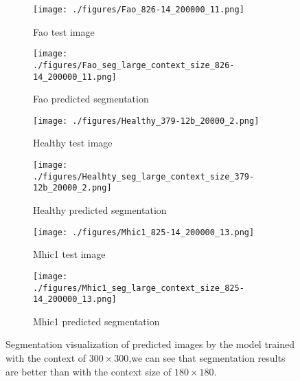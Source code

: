 \begin{figure}[th!]
    \begin{subfigure}{.5\textwidth}
         \centering
        \texttt{[image: ./figures/Fao\_826-14\_200000\_11.png]}
        \caption{Fao test image}
        \label{fig:fao_raw}
    \end{subfigure}
  \begin{subfigure}{.5\textwidth}
        \centering
       \texttt{[image: ./figures/Fao\_seg\_large\_context\_size\_826-14\_200000\_11.png]}
        \caption{Fao predicted segmentation}
        \label{fig:healthy_raw}
    \end{subfigure}
    \begin{subfigure}{.5\textwidth}
        \centering
        \texttt{[image: ./figures/Healthy\_379-12b\_20000\_2.png]}
        \caption{Healthy test image}
        \label{fig:healthy_label}
    \end{subfigure}
    \begin{subfigure}{.5\textwidth}
        \centering
        \texttt{[image: ./figures/Healhty\_seg\_large\_context\_size\_379-12b\_20000\_2.png]}
        \caption{Healthy predicted segmentation}
        \label{fig:healthy_label}
    \end{subfigure}

\begin{subfigure}{.5\textwidth}
        \centering
        \texttt{[image: ./figures/Mhic1\_825-14\_200000\_13.png]}
        \caption{Mhic1 test image}
        \label{fig:healthy_label}
    \end{subfigure}
    \begin{subfigure}{.5\textwidth}
        \centering
        \texttt{[image: ./figures/Mhic1\_seg\_large\_context\_size\_825-14\_200000\_13.png]}
        \caption{Mhic1 predicted segmentation}
        \label{fig:healthy_label}
    \end{subfigure}    
  
  \caption{Segmentation visualization of predicted images by the model trained with the context of $300 \times 300 $,we can see that segmentation results are better than with the context size of $ 180 \times 180 $.}  
\end{figure}


